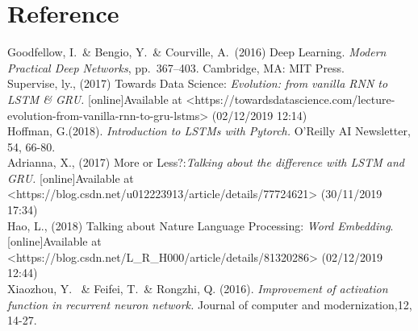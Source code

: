 \documentclass{article}
\begin{document}
\subsection{}
\section*{Reference}
\small

\noindent [1] Goodfellow, I.\ \& Bengio, Y.\ \& Courville, A.\ (2016) Deep Learning. {\it Modern Practical Deep Networks},
pp.\ 367--403. Cambridge, MA: MIT Press.\\

\noindent[2] Supervise, ly., (2017) Towards Data Science:
{\it Evolution: from vanilla RNN to LSTM \& GRU.} [online]Available at <https://towardsdatascience.com/lecture-evolution-from-vanilla-rnn-to-gru-lstms> (02/12/2019 12:14)\\

\noindent[3] Hoffman, G.(2018). {\it Introduction to LSTMs with Pytorch.} O'Reilly AI Newsletter, 54, 66-80.\\

\noindent[4] Adrianna, X., (2017) More or Less?:{\it Talking about the difference with LSTM and GRU.}
[online]Available at <https://blog.csdn.net/u012223913/article/details/77724621> (30/11/2019 17:34)\\

\noindent[5]  Hao, L., (2018) Talking about Nature Language Processing: {\it
Word Embedding}. [online]Available at <https://blog.csdn.net/L\_R\_H000/article/details/81320286> (02/12/2019 12:44)\\

\noindent[6]  Xiaozhou, Y. \ \& Feifei, T.\ \& Rongzhi, Q. (2016). {\it Improvement of activation function in recurrent neuron network.} Journal of computer and modernization,12, 14-27.\\
\end{document}

